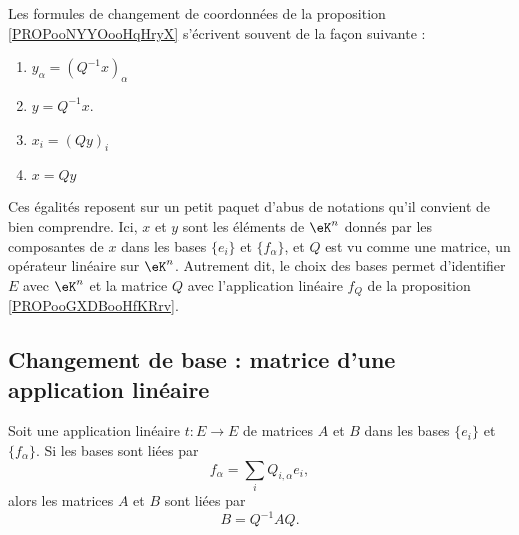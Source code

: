 \begin{normaltext}      \label{NORMooNWKZooPMwYTO}
	Les formules de changement de coordonnées de la proposition \ref{PROPooNYYOooHqHryX} s'écrivent souvent de la façon suivante :
	\begin{enumerate}
		\item       \label{ITEMooLHQCooBRvSlp}
		      \( y_{\alpha}=(Q^{-1}x)_{\alpha}\)
		\item       \label{ITEMooNXUGooJIeoBf}
		      \( y=Q^{-1}x\).
		\item       \label{ITEMooEFILooNENamW}
		      \( x_i=(Qy)_i\)
		\item       \label{ITEMooMOKHooFEJvIW}
		      \( x=Qy\)
	\end{enumerate}
	Ces égalités reposent sur un petit paquet d'abus de notations qu'il convient de bien comprendre. Ici, \( x\) et \( y\) sont les éléments de \( \eK^n\) donnés par les composantes de \( x\) dans les bases \( \{ e_i \}\) et \( \{ f_{\alpha} \}\), et \( Q\) est vu comme une matrice, un opérateur linéaire sur \( \eK^n\). Autrement dit, le choix des bases permet d'identifier \( E\) avec \( \eK^n\) et la matrice \( Q\) avec l'application linéaire \( f_Q\) de la proposition \ref{PROPooGXDBooHfKRrv}.
\end{normaltext}

\subsection{Changement de base : matrice d'une application linéaire}

\begin{proposition}     \label{PROPooNZBEooWyCXTw}
	Soit une application linéaire \( t\colon E\to E\) de matrices \( A\) et \( B\) dans les bases \( \{ e_i \}\) et \( \{ f_{\alpha} \}\). Si les bases sont liées par
	\begin{equation}
		f_{\alpha}=\sum_i Q_{i,\alpha}e_i,
	\end{equation}
	alors les matrices \( A\) et \( B\) sont liées par
	\begin{equation}
		B=Q^{-1}AQ.
	\end{equation}
\end{proposition}

